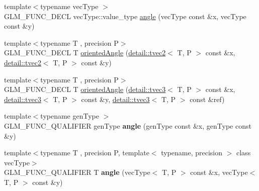 \begin{DoxyCompactItemize}
\item 
{\footnotesize template$<$typename vec\+Type $>$ }\\G\+L\+M\+\_\+\+F\+U\+N\+C\+\_\+\+D\+E\+CL vec\+Type\+::value\+\_\+type \hyperlink{group__gtx__vector__angle_gab8691008a2536b681b711211816c14f7}{angle} (vec\+Type const \&x, vec\+Type const \&y)
\item 
{\footnotesize template$<$typename T , precision P$>$ }\\G\+L\+M\+\_\+\+F\+U\+N\+C\+\_\+\+D\+E\+CL T \hyperlink{group__gtx__vector__angle_ga6f9cbae1b02b49ad92a1d0070649f038}{oriented\+Angle} (\hyperlink{structglm_1_1detail_1_1tvec2}{detail\+::tvec2}$<$ T, P $>$ const \&x, \hyperlink{structglm_1_1detail_1_1tvec2}{detail\+::tvec2}$<$ T, P $>$ const \&y)
\item 
{\footnotesize template$<$typename T , precision P$>$ }\\G\+L\+M\+\_\+\+F\+U\+N\+C\+\_\+\+D\+E\+CL T \hyperlink{group__gtx__vector__angle_ga2aefc221dd5ed9fdacc17c28eea76775}{oriented\+Angle} (\hyperlink{structglm_1_1detail_1_1tvec3}{detail\+::tvec3}$<$ T, P $>$ const \&x, \hyperlink{structglm_1_1detail_1_1tvec3}{detail\+::tvec3}$<$ T, P $>$ const \&y, \hyperlink{structglm_1_1detail_1_1tvec3}{detail\+::tvec3}$<$ T, P $>$ const \&ref)
\item 
{\footnotesize template$<$typename gen\+Type $>$ }\\G\+L\+M\+\_\+\+F\+U\+N\+C\+\_\+\+Q\+U\+A\+L\+I\+F\+I\+ER gen\+Type {\bfseries angle} (gen\+Type const \&x, gen\+Type const \&y)\hypertarget{namespaceglm_a0634619b62db66fe6a4bd04da1feabea}{}\label{namespaceglm_a0634619b62db66fe6a4bd04da1feabea}

\item 
{\footnotesize template$<$typename T , precision P, template$<$ typename, precision $>$ class vec\+Type$>$ }\\G\+L\+M\+\_\+\+F\+U\+N\+C\+\_\+\+Q\+U\+A\+L\+I\+F\+I\+ER T {\bfseries angle} (vec\+Type$<$ T, P $>$ const \&x, vec\+Type$<$ T, P $>$ const \&y)\hypertarget{namespaceglm_a8501bc310fa98bb40bec1b3c285183f1}{}\label{namespaceglm_a8501bc310fa98bb40bec1b3c285183f1}


\end{DoxyCompactItemize}
